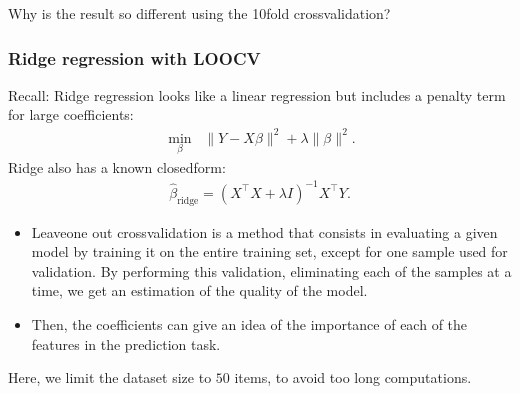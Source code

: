 \documentclass[letterpaper,10pt,english]{jupyterBook}
\begin{document}
\sphinxAtStartPar
Why is the result so different using the 10\sphinxhyphen{}fold cross\sphinxhyphen{}validation?


\subsubsection{Ridge regression with LOO\sphinxhyphen{}CV}
\label{\detokenize{05:ridge-regression-with-loo-cv}}
\sphinxAtStartPar
Recall: Ridge regression looks like a linear regression but includes a penalty term for large coefficients:
\begin{equation*}
\begin{split}
  \min_{\beta} \;\; \| Y - X \beta \|^2 + \lambda \| \beta \|^2.
\end{split}
\end{equation*}
\sphinxAtStartPar
Ridge also has a known closed\sphinxhyphen{}form:
\begin{equation*}
\begin{split}
  \hat{\beta}_{\mathrm{ridge}} = (X^\top X + \lambda I)^{-1} X^\top Y.
\end{split}
\end{equation*}\begin{itemize}
\item {} 
\sphinxAtStartPar
Leave\sphinxhyphen{}one out cross\sphinxhyphen{}validation is a method that consists in evaluating a given model by training it on the entire training set, except for one sample used for validation. By performing this validation, eliminating each of the samples at a time, we get an estimation of the quality of the model.

\item {} 
\sphinxAtStartPar
Then, the coefficients can give an idea of the importance of each of the features in the prediction task.

\end{itemize}

\sphinxAtStartPar
Here, we limit the dataset size to \(50\) items, to avoid too long computations.
\end{document}
